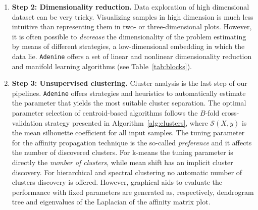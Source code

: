 \documentclass[twoside,11pt]{article}
\makeatletter
\newcommand{\ade}{\texttt{Adenine}\@\xspace}
\makeatother
\begin{document}
\begin{enumerate}[leftmargin=*]
  \item[]{\bf Step 2: Dimensionality reduction.}
  Data exploration of high dimensional dataset can be very tricky. Visualizing samples in high dimension is much less intuitive than representing them in two- or three-dimensional plots. However, it is often possible to \emph{decrease} the dimensionality of the problem estimating by means of different strategies, a low-dimensional embedding in which the data lie. %
  \ade offers a set of linear and nonlinear dimensionality reduction and manifold learning algorithms (see Table~\ref{tab:blocks}).

  \item[]{\bf Step 3: Unsupervised clustering.}
  Cluster analysis is the last step of our pipelines. 
  \ade offers strategies and heuristics to automatically estimate the parameter that yields the most suitable cluster separation. The optimal parameter selection of centroid-based algorithms follows the $B$-fold cross-validation strategy presented in Algorithm~\ref{alg:clusters}, where $\mathcal{S}(X,y)$ is the mean silhouette coefficient \citep{rousseeuw1987silhouettes} for all input samples.
  The tuning parameter for the affinity propagation technique \citep{frey2007clustering} is the so-called \emph{preference} and it affects the number of discovered clusters. For k-means \citep{bishop2006pattern} the tuning parameter is directly the \emph{number of clusters}, while mean shift \citep{comaniciu2002mean} has an implicit cluster discovery. For hierarchical \citep{friedman2001elements} and spectral clustering \citep{shi2000normalized} no automatic number of clusters discovery is offered. However, graphical aids to evaluate the performance with fixed parameters are generated as, respectively, dendrogram tree and eigenvalues of the Laplacian of the affinity matrix plot.
 

\end{enumerate}
\end{document}

